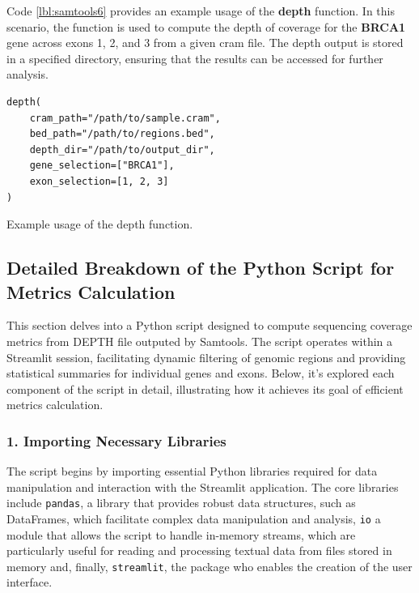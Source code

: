 Code \ref{lbl:samtools6} provides an example usage of the \textbf{depth} function. In this scenario, the function is used to compute the depth of coverage for the \textbf{BRCA1} gene across exons 1, 2, and 3 from a given \ac{cram} file. The depth output is stored in a specified directory, ensuring that the results can be accessed for further analysis.

\begin{longlisting}
\begin{verbatim}
depth(
    cram_path="/path/to/sample.cram", 
    bed_path="/path/to/regions.bed", 
    depth_dir="/path/to/output_dir", 
    gene_selection=["BRCA1"], 
    exon_selection=[1, 2, 3]
)
\end{verbatim}
\caption{Example usage of the depth function.}
\label{lbl:samtools6}
\end{longlisting}

\subsection{Detailed Breakdown of the Python Script for Metrics Calculation}

This section delves into a Python script designed to compute sequencing coverage metrics from DEPTH file outputed by Samtools. The script operates within a Streamlit session, facilitating dynamic filtering of genomic regions and providing statistical summaries for individual genes and exons. Below, it's explored each component of the script in detail, illustrating how it achieves its goal of efficient metrics calculation.

\subsubsection{\textbf{1. Importing Necessary Libraries}}

The script begins by importing essential Python libraries required for data manipulation and interaction with the Streamlit application. The core libraries include \texttt{pandas}, a library that provides robust data structures, such as DataFrames, which facilitate complex data manipulation and analysis, \texttt{io} a module that allows the script to handle in-memory streams, which are particularly useful for reading and processing textual data from files stored in memory and, finally, \texttt{streamlit}, the package who enables the creation of the user interface.

